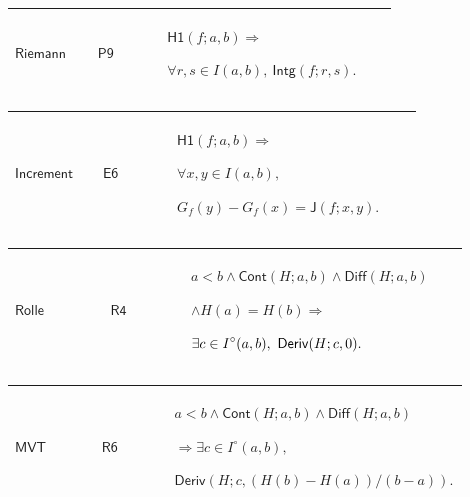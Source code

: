 \documentclass[12pt,reqno]{amsart}
\theoremstyle{blueplain}
\numberwithin{equation}{section}
\begin{document}
{\scriptsize \setlength{\parskip}{0pt}\nointerlineskip
\noindent 
\begin{tabular}{|@{}>{\centering\arraybackslash}m{0.19251\linewidth}|>{\centering\arraybackslash}m{0.16845\linewidth}|>{\centering\arraybackslash}m{0.53904\linewidth}|}
\hline
\hypertarget{lem:Riemann}{$\displaystyle \mathsf{Riemann}$} & \hyperlink{proof:P9}%
{$\displaystyle \mathsf{P9}$} & $\displaystyle \mathsf{H1}(f;a,b)\Rightarrow$%
\par$\displaystyle \forall r,s\in I(a,b),\ \mathsf{Intg}(f;r,s).$ \\ \hline
\end{tabular}%
}

{\scriptsize \setlength{\parskip}{0pt}\nointerlineskip
\noindent 
\begin{tabular}{|@{}>{\centering\arraybackslash}m{0.19251\linewidth}|>{\centering\arraybackslash}m{0.16845\linewidth}|>{\centering\arraybackslash}m{0.53904\linewidth}|}
\hline
\hypertarget{lem:Increment}{$\displaystyle \mathsf{Increment}$} & \hyperlink{proof:E6}%
{$\displaystyle \mathsf{E6}$} & $\displaystyle \mathsf{H1}(f;a,b)\Rightarrow$%
\par$\displaystyle \forall x,y\in I(a,b),$\par$\displaystyle G_f(y)-G_f(x)=%
\mathsf{J}(f;x,y).$ \\ \hline
\end{tabular}%
}

{\scriptsize \setlength{\parskip}{0pt}\nointerlineskip
\noindent 
\begin{tabular}{|@{}>{\centering\arraybackslash}m{0.19251\linewidth}|>{\centering\arraybackslash}m{0.16845\linewidth}|>{\centering\arraybackslash}m{0.53904\linewidth}|}
\hline
\hypertarget{lem:Rolle}{$\displaystyle \mathsf{Rolle}$} & \hyperlink{proof:R4}%
{$\displaystyle \mathsf{R4}$} & $\displaystyle a<b\land\mathsf{Cont}%
(H;a,b)\land\mathsf{Diff}(H;a,b)$\par$\displaystyle \land
H(a)=H(b)\Rightarrow$\par$\displaystyle \exists c\in I^\circ(a,b),\ \mathsf{%
Deriv}(H;c,0).$ \\ \hline
\end{tabular}%
}

{\scriptsize \setlength{\parskip}{0pt}\nointerlineskip
\noindent 
\begin{tabular}{|@{}>{\centering\arraybackslash}m{0.19251\linewidth}|>{\centering\arraybackslash}m{0.16845\linewidth}|>{\centering\arraybackslash}m{0.53904\linewidth}|}
\hline
\hypertarget{lem:MVT}{$\displaystyle \mathsf{MVT}$} & \hyperlink{proof:R6}{$%
\displaystyle \mathsf{R6}$} & $\displaystyle a<b\land\mathsf{Cont}%
(H;a,b)\land\mathsf{Diff}(H;a,b)$\par$\displaystyle \Rightarrow\exists c\in
I^\circ(a,b),$\par$\displaystyle \mathsf{Deriv}(H;c,(H(b)-H(a))/(b-a)).$ \\ 
\hline
\end{tabular}%
}
\end{document}
